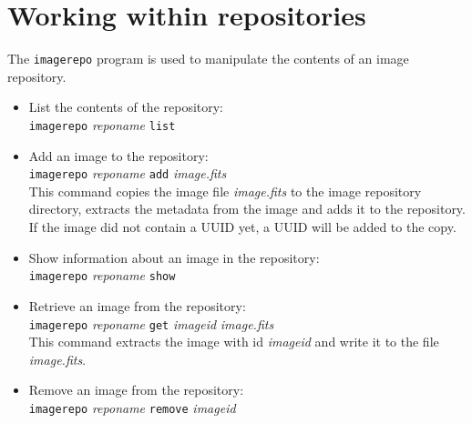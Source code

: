 \section{Working within repositories}
The \texttt{imagerepo} program is used to manipulate the contents of
an image repository.

\begin{itemize}
\item
List the contents of the repository:
\\
\texttt{imagerepo} \textit{reponame} \texttt{list}
\item
Add an image to the repository:
\\
\texttt{imagerepo} \textit{reponame} \texttt{add} \textit{image.fits}
\\
This command copies the image file \textit{image.fits} to the
image repository directory, extracts the metadata from the image and
adds it to the repository.
If the image did not contain a UUID yet, a UUID will be added to the
copy.
\item
Show information about an image in the repository:
\\
\texttt{imagerepo} \textit{reponame} \texttt{show}
\item
Retrieve an image from the repository:
\\
\texttt{imagerepo} \textit{reponame} \texttt{get} \textit{imageid} \textit{image.fits}
\\
This command extracts the image with id \textit{imageid} and write it to
the file \textit{image.fits}.
\item
Remove an image from the repository:
\\
\texttt{imagerepo} \textit{reponame} \texttt{remove} \textit{imageid}
\end{itemize}

